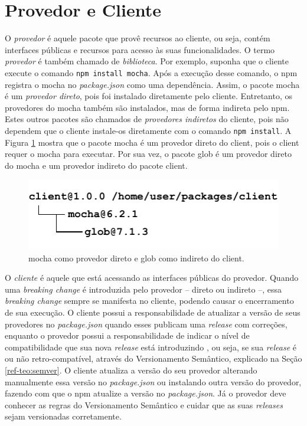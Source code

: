 \section{Provedor e Cliente}
\label{ref-teo:prov_clie}
O \textit{provedor} é aquele pacote que provê recursos ao cliente, ou seja, contém interfaces públicas e recursos para acesso às suas funcionalidades. O termo \textit{provedor} é também chamado de \textit{biblioteca}. Por exemplo, suponha que o cliente execute o comando \texttt{npm install mocha}. Após a execução desse comando, o \textsf{npm} registra o \textsf{mocha} no \textit{package.json} como uma dependência. Assim, o pacote \textsf{mocha} é um \textit{provedor direto}, pois foi instalado diretamente pelo cliente. Entretanto, os provedores do \textsf{mocha} também são instalados, mas de forma indireta pelo \textsf{npm}. Estes outros pacotes são chamados de \textit{provedores indiretos} do cliente, pois não dependem que o cliente instale-os diretamente com o comando \texttt{npm install}. A Figura \ref{fig:provider} mostra que o pacote \textsf{mocha} é um provedor direto do \textsf{client}, pois o \textsf{client} requer o \textsf{mocha} para executar. Por sua vez, o pacote \textsf{glob} é um provedor direto do \textsf{mocha} e um provedor indireto do pacote \textsf{client}.

\begin{figure}
    \centering
    \includegraphics[scale=1.4]{figuras/provider_directly_undirectly.pdf}
    \caption{\textsf{mocha} como provedor direto e \textsf{glob} como indireto do \textsf{client}.}
    \label{fig:provider}
\end{figure}{}

O \textit{cliente} é aquele que está acessando as interfaces públicas do provedor. Quando uma \textit{breaking change} é introduzida pelo provedor -- direto ou indireto --, essa \textit{breaking change} sempre se manifesta no cliente, podendo causar o encerramento de sua execução. O cliente possui a responsabilidade de atualizar a versão de seus provedores no \textit{package.json} quando esses publicam uma \textit{release} com correções, enquanto o provedor possui a responsabilidade de indicar o nível de compatibilidade que sua nova \textit{release} está introduzindo \cite{teorical_reference:semver}, ou seja, se sua \textit{release} é ou não retro-compatível, através do Versionamento Semântico, explicado na Seção \ref{ref-teo:semver}. O cliente atualiza a versão do seu provedor alterando manualmente essa versão no \textit{package.json} ou instalando outra versão do provedor, fazendo com que o \textsf{npm} atualize a versão no \textit{package.json}. Já o provedor deve conhecer as regras do Versionamento Semântico e cuidar que as suas \textit{releases} sejam versionadas corretamente.

